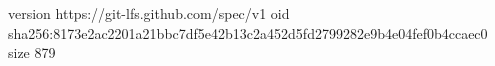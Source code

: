 version https://git-lfs.github.com/spec/v1
oid sha256:8173e2ac2201a21bbc7df5e42b13c2a452d5fd2799282e9b4e04fef0b4ccaec0
size 879
